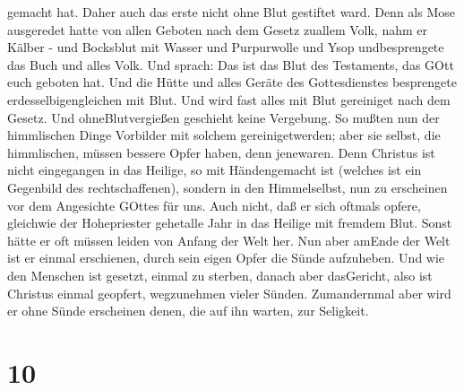gemacht hat.  Daher auch das erste nicht ohne Blut
gestiftet ward.  Denn als Mose ausgeredet hatte von allen
Geboten nach dem Gesetz zuallem Volk, nahm er Kälber - und Bocksblut mit
Wasser und Purpurwolle und Ysop undbesprengete das Buch und alles Volk.
 Und sprach: Das ist das Blut des Testaments, das GOtt euch
geboten hat.  Und die Hütte und alles Geräte des
Gottesdienstes besprengete erdesselbigengleichen mit Blut. 
Und wird fast alles mit Blut gereiniget nach dem Gesetz. Und
ohneBlutvergießen geschieht keine Vergebung.  So mußten nun
der himmlischen Dinge Vorbilder mit solchem gereinigetwerden; aber sie
selbst, die himmlischen, müssen bessere Opfer haben, denn jenewaren.
 Denn Christus ist nicht eingegangen in das Heilige, so mit
Händengemacht ist (welches ist ein Gegenbild des rechtschaffenen),
sondern in den Himmelselbst, nun zu erscheinen vor dem Angesichte GOttes
für uns.  Auch nicht, daß er sich oftmals opfere, gleichwie
der Hohepriester gehetalle Jahr in das Heilige mit fremdem Blut.
 Sonst hätte er oft müssen leiden von Anfang der Welt her.
Nun aber amEnde der Welt ist er einmal erschienen, durch sein eigen
Opfer die Sünde aufzuheben.  Und wie den Menschen ist
gesetzt, einmal zu sterben, danach aber dasGericht,  also
ist Christus einmal geopfert, wegzunehmen vieler Sünden. Zumandernmal
aber wird er ohne Sünde erscheinen denen, die auf ihn warten, zur
Seligkeit.

\hypertarget{section-8}{%
\section{10}\label{section-8}}

